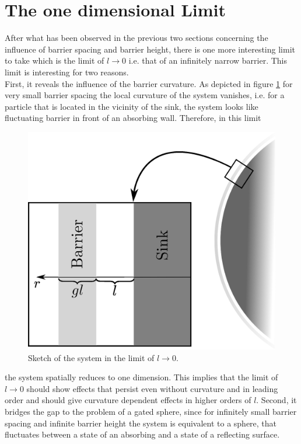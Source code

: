 \section{The one dimensional Limit}
\label{1dLimit}
After what has been observed in the previous two sections concerning the influence of barrier spacing and barrier height, there is one more interesting limit to take which is the limit of $l \rightarrow 0$ i.e. that of an infinitely narrow barrier. This limit is interesting for two reasons. \\
First, it reveals the influence of the barrier curvature. As depicted in figure \ref{fig:llimit_skizze} for very small barrier spacing the local curvature of the system vanishes, i.e. for a particle that is located in the vicinity of the sink, the system looks like fluctuating barrier in front of an absorbing wall. Therefore, in this limit \par
\begin{figure}
        \includegraphics[width = 1 \textwidth]{plots/tlimit.eps}
        \caption{Sketch of the system in the limit of $l\rightarrow 0$.}
        \label{fig:llimit_skizze}
\end{figure}
the system spatially reduces to one dimension. This implies that the limit of $l \rightarrow 0$ should show effects that persist even without curvature and in leading order and should give curvature dependent effects in higher orders of $l$.
Second, it bridges the gap to the problem of a gated sphere, since for infinitely small barrier spacing and infinite barrier height the system is equivalent to a sphere, that fluctuates between a state of an absorbing and a state of a reflecting surface.\par
